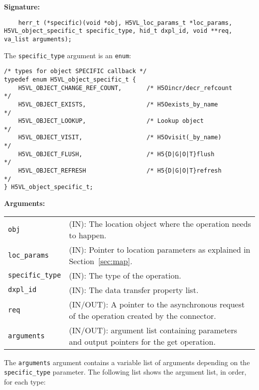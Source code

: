 \begin{mdframed}[style=bgbox]
\textbf{Signature:}
\begin{lstlisting}
	herr_t (*specific)(void *obj, H5VL_loc_params_t *loc_params, H5VL_object_specific_t specific_type, hid_t dxpl_id, void **req, va_list arguments);
\end{lstlisting}

The \texttt{specific\_type} argument is an \texttt{enum}:
\begin{lstlisting}
/* types for object SPECIFIC callback */
typedef enum H5VL_object_specific_t {                                            
    H5VL_OBJECT_CHANGE_REF_COUNT,       /* H5Oincr/decr_refcount             */  
    H5VL_OBJECT_EXISTS,                 /* H5Oexists_by_name                 */  
    H5VL_OBJECT_LOOKUP,                 /* Lookup object                     */  
    H5VL_OBJECT_VISIT,                  /* H5Ovisit(_by_name)                */  
    H5VL_OBJECT_FLUSH,                  /* H5{D|G|O|T}flush                  */  
    H5VL_OBJECT_REFRESH                 /* H5{D|G|O|T}refresh                */  
} H5VL_object_specific_t; 
\end{lstlisting}

\textbf{Arguments:}\\
\begin{tabular}{l p{13.5cm}}
  \texttt{obj} & (IN): The location object  where the operation needs to happen.\\
  \texttt{loc\_params} & (IN): Pointer to location parameters as explained in Section~\ref{sec:map}.\\
  \texttt{specific\_type} & (IN): The type of the operation.\\
  \texttt{dxpl\_id} & (IN): The data transfer property list.\\
  \texttt{req} & (IN/OUT): A pointer to the asynchronous request of the
  operation created by the connector.\\
  \texttt{arguments} & (IN/OUT): argument list containing parameters and
  output pointers for the get operation. \\
\end{tabular}
\end{mdframed}

The \texttt{arguments} argument contains a variable list of arguments
depending on the \texttt{specific\_type} parameter. The following list shows
the argument list, in order, for each type:

